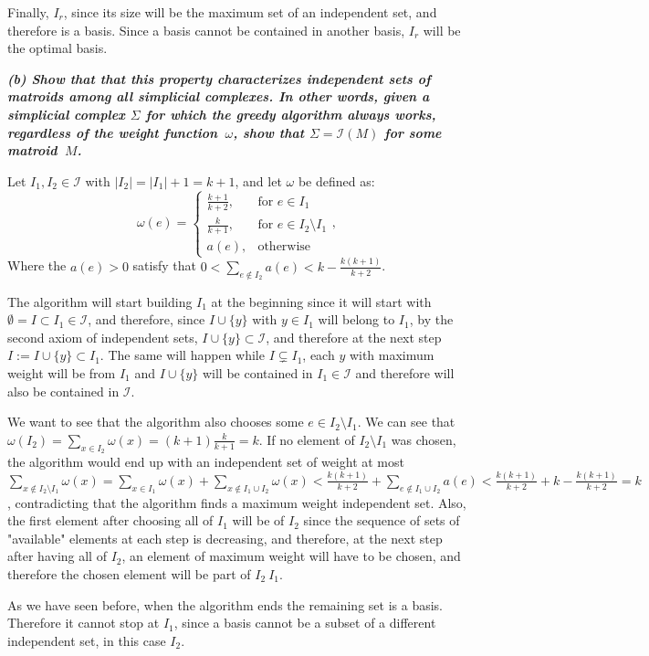 Finally, $I_r$, since its size will be the maximum set of an independent set, and therefore is a basis. Since a basis cannot be contained in another basis, $I_r$ will be the optimal basis.
\vspace{3pt}

\hspace{5pt}\textbf{\textit{(b) Show that that this property characterizes independent sets of matroids among all simplicial complexes. In other words, given a simplicial complex $\Sigma$ for which the greedy algorithm always works, regardless of the weight function~$\omega$, show that $\Sigma = \mathcal I(M)$ for some matroid~$M$.}}

\vspace{3pt}

Let $I_1, I_2 \in \mathcal I$ with $|I_2| = |I_1| + 1 = k + 1$, and let $\omega$ be defined as:
\[
\omega(e) = \left\{
\begin{array}{lr}
	\frac{k+1}{k+2}, & \text{for } e \in I_1 \\
	\frac{k}{k+1}, & \text{for } e \in I_2 \setminus I_1\\
    a(e), & \text{otherwise }
\end{array}
\right. ,
\]
Where the $a(e) > 0$ satisfy that $0 < \sum_{e \notin I_2} a(e) < k - \frac{k(k+1)}{k+2}$.

The algorithm will start building $I_1$ at the beginning since it will start with $\emptyset = I \subset I_1 \in \mathcal I$, and therefore, since $I \cup \{y\}$ with $y \in I_1$ will belong to $I_1$, by the second axiom of independent sets, $I \cup \{y\} \subset \mathcal I$, and therefore at the next step $I := I \cup \{y\} \subset I_1$. The same will happen while $I \subsetneq I_1$, each $y$ with maximum weight will be from $I_1$ and $I \cup \{y\}$ will be contained in $I_1 \in \mathcal I$ and therefore will also be contained in $\mathcal I$.

We want to see that the algorithm also chooses some $e \in I_2 \setminus I_1$. We can see that $\omega(I_2) = \sum_{x \in I_2} \omega(x) = (k+1) \frac{k}{k+1} = k$. If no element of $I_2 \setminus I_1$ was chosen, the algorithm would end up with an independent set of weight at most $\sum_{x \notin I_2 \setminus I_1} \omega(x) = \sum_{x \in I_1} \omega(x) + \sum_{x \notin I_1 \cup I_2} \omega(x) < \frac{k(k+1)}{k+2} + \sum_{e \notin I_1 \cup I_2} a(e) <  \frac{k(k+1)}{k+2} + k - \frac{k(k+1)}{k+2} = k$, contradicting that the algorithm finds a maximum weight independent set. Also, the first element after choosing all of $I_1$ will be of $I_2$ since the sequence of sets of "available" elements at each step is decreasing, and therefore, at the next step after having all of $I_2$, an element of maximum weight will have to be chosen, and therefore the chosen element will be part of $I_2 \ I_1$.

As we have seen before, when the algorithm ends the remaining set is a basis. Therefore it cannot stop at $I_1$, since a basis cannot be a subset of a different independent set, in this case $I_2$.
